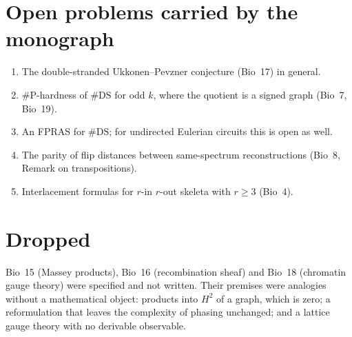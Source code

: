 \documentclass[11pt]{article}
\newcommand{\DS}{\mathrm{DS}}
\newcommand{\sP}{\#\mathrm{P}}
\begin{document}
\section*{Open problems carried by the monograph}
\begin{enumerate}
\item The double-stranded Ukkonen--Pevzner conjecture (Bio~17) in general.
\item $\sP$-hardness of $\#\DS$ for odd $k$, where the quotient is a signed graph (Bio~7, Bio~19).
\item An FPRAS for $\#\DS$; for undirected Eulerian circuits this is open as well.
\item The parity of flip distances between same-spectrum reconstructions (Bio~8, Remark on
transpositions).
\item Interlacement formulas for $r$-in $r$-out skeleta with $r\ge3$ (Bio~4).
\end{enumerate}

\section*{Dropped}
Bio~15 (Massey products), Bio~16 (recombination sheaf) and Bio~18 (chromatin gauge theory) were
specified and not written. Their premises were analogies without a mathematical object: products into
$H^2$ of a graph, which is zero; a reformulation that leaves the complexity of phasing unchanged; and a
lattice gauge theory with no derivable observable.
\end{document}
